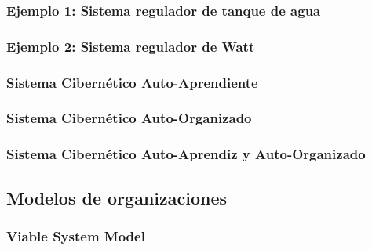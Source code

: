 \subsubsection{Ejemplo 1: Sistema regulador de tanque de agua}
\subsubsection{Ejemplo 2: Sistema regulador de Watt}
\subsubsection{Sistema Cibernético Auto-Aprendiente}
\subsubsection{Sistema Cibernético Auto-Organizado}
\subsubsection{Sistema Cibernético Auto-Aprendiz y Auto-Organizado}

\subsection{Modelos de organizaciones}
\subsubsection{Viable System Model}
